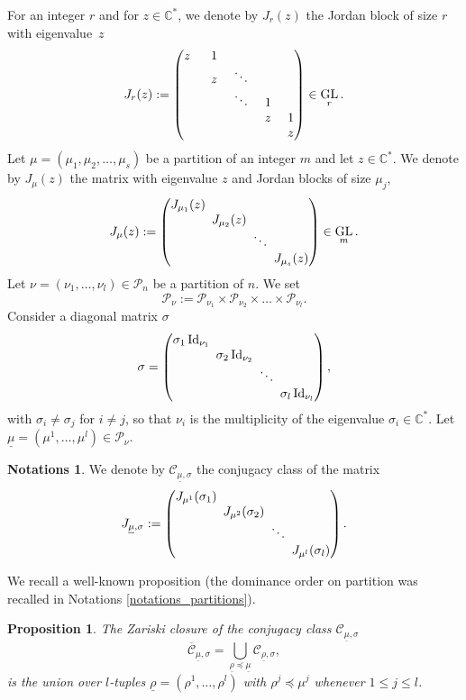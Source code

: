 \documentclass[11pt]{article}
\theoremstyle{definition}
\newtheorem{notations}[definition]{Notations}
\theoremstyle{plain}
\newtheorem{proposition}[definition]{Proposition}
\DeclareMathOperator{\Id}{Id}
\DeclareMathOperator{\GL}{GL}
\newcommand{\C}{\mathbb{C}}
\newcommand{\Part}{\mathcal{P}}
\begin{document}
For an integer $r$ and for $ z \in \C^*$, we denote by $J_r (z)$ the Jordan block of size $r$ with eigenvalue~$z$
\[\arraycolsep6.5pt
J_{r}(z):= \begin{pmatrix}
z \ & 1 & & & \\
& z & \ddots & &\\
& & \ddots & 1 & \\
& & & z & 1 \\
& & & & z
\end{pmatrix} \in \GL_{r}.
\]
Let $\mu=(\mu_1,\mu_2,\dots,\mu_s)$ be a partition of an integer $m$ and let $z \in \C^*$. We denote by $J_{\mu} (z)$ the matrix with eigenvalue $z$ and Jordan blocks of size $\mu_j$,
\[\arraycolsep2.5pt
J_{\mu} (z) :=
\begin{pmatrix}
J_{\mu_1}(z) & & &\\
& J_{\mu_2}(z) & & \\
& & \ddots & \\
& & & J_{\mu_s}(z)
\end{pmatrix} \in \GL_{m}.
\]
Let $\nu=(\nu_1,\dots,\nu_l) \in \Part_n$ be a partition of $n$. We set
\[
\Part_{\nu} := \Part_{\nu_1}\times\Part_{\nu_2} \times\dots\times \Part_{\nu_l}.
\]
Consider a diagonal matrix $\sigma$
\begin{equation}\label{eq_def_sigma}
\arraycolsep2.5pt
\sigma = \begin{pmatrix}
\sigma_1 \Id_{\nu_1} & & & \\
& \sigma_2 \Id_{\nu_2} & & \\
& & \ddots & \\
& & & \sigma_l \Id_{\nu_l}
\end{pmatrix},
\end{equation}
with $\sigma_i \ne \sigma_j$ for $i\ne j$, so that $\nu_i$ is the multiplicity of the eigenvalue $\sigma_i\in \C^*$. Let $\underline{\mu}= \left(\mu^{1},\dots,\mu^{l}\right)\in \Part_{\nu}$.
\begin{notations}\label{notations_jmus}
We denote by $\mathcal{C}_{\underline{\mu},\sigma}$ the conjugacy class of the matrix
\[\arraycolsep2.5pt
J_{\underline{\mu},\sigma}:=\begin{pmatrix}
J_{\mu^{1}}(\sigma_1) & & & \\
& J_{\mu^{2}}(\sigma_2) & & \\
& & \ddots & \\
& & & J_{\mu^{l}}(\sigma_l)
\end{pmatrix}.
\]
\end{notations}
We recall a well-known proposition (the dominance order on partition was recalled in Notations \ref{notations_partitions}).
\begin{proposition}
The Zariski closure of the conjugacy class $\mathcal{C}_{\underline{\mu},\sigma}$
\[
\overline{\mathcal{C}}_{\underline{\mu},\sigma} = \bigcup_{\underline{\rho}\preceq\underline{\mu}} \mathcal{C}_{\underline{\rho},\sigma},
\]
is the union over $l$-tuples $\underline{\rho}=\left(\rho^{1},\dots,\rho^{l}\right)$ with
$
\rho^{j}\preceq \mu^{j}$ whenever $1\le j \le l
$.
\end{proposition}
\end{document}

